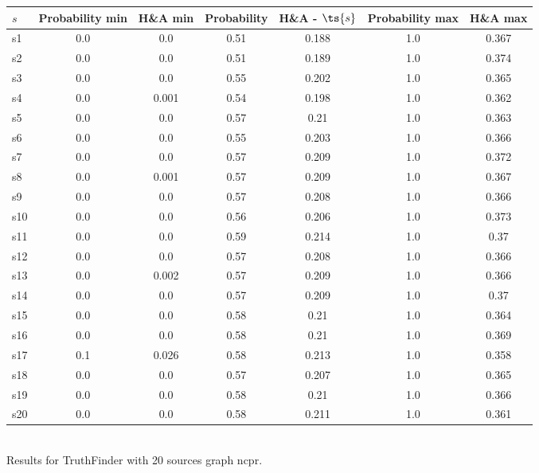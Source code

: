 \documentclass{article}
\begin{document}
\noindent\begin{tabular}{|l|c|c|c|c|c|c|}
\hline
$s$& Probability min & H\&A min & Probability & H\&A - $\ts{s}$ & Probability max & H\&A max\\
\hline
s1 &0.0 & 0.0 & 0.51 & 0.188 & 1.0 & 0.367\\
\hline
s2 &0.0 & 0.0 & 0.51 & 0.189 & 1.0 & 0.374\\
\hline
s3 &0.0 & 0.0 & 0.55 & 0.202 & 1.0 & 0.365\\
\hline
s4 &0.0 & 0.001 & 0.54 & 0.198 & 1.0 & 0.362\\
\hline
s5 &0.0 & 0.0 & 0.57 & 0.21 & 1.0 & 0.363\\
\hline
s6 &0.0 & 0.0 & 0.55 & 0.203 & 1.0 & 0.366\\
\hline
s7 &0.0 & 0.0 & 0.57 & 0.209 & 1.0 & 0.372\\
\hline
s8 &0.0 & 0.001 & 0.57 & 0.209 & 1.0 & 0.367\\
\hline
s9 &0.0 & 0.0 & 0.57 & 0.208 & 1.0 & 0.366\\
\hline
s10 &0.0 & 0.0 & 0.56 & 0.206 & 1.0 & 0.373\\
\hline
s11 &0.0 & 0.0 & 0.59 & 0.214 & 1.0 & 0.37\\
\hline
s12 &0.0 & 0.0 & 0.57 & 0.208 & 1.0 & 0.366\\
\hline
s13 &0.0 & 0.002 & 0.57 & 0.209 & 1.0 & 0.366\\
\hline
s14 &0.0 & 0.0 & 0.57 & 0.209 & 1.0 & 0.37\\
\hline
s15 &0.0 & 0.0 & 0.58 & 0.21 & 1.0 & 0.364\\
\hline
s16 &0.0 & 0.0 & 0.58 & 0.21 & 1.0 & 0.369\\
\hline
s17 &0.1 & 0.026 & 0.58 & 0.213 & 1.0 & 0.358\\
\hline
s18 &0.0 & 0.0 & 0.57 & 0.207 & 1.0 & 0.365\\
\hline
s19 &0.0 & 0.0 & 0.58 & 0.21 & 1.0 & 0.366\\
\hline
s20 &0.0 & 0.0 & 0.58 & 0.211 & 1.0 & 0.361\\
\hline
\end{tabular}\\

\noindent Results for TruthFinder with 20 sources graph ncpr.
\end{document}
